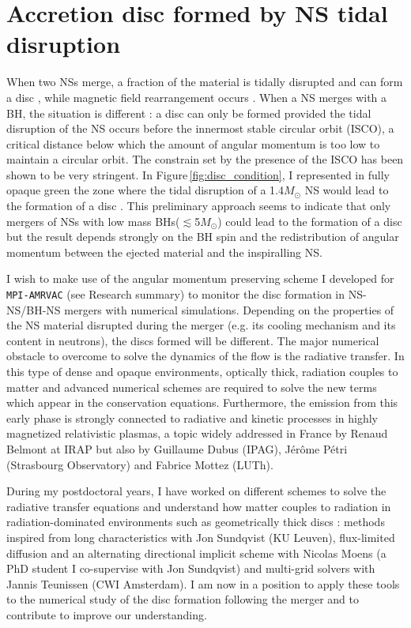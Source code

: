 \documentclass[11pt,onecolumn]{article}
\makeatletter
\newcommand*{\ns}{NS\@\xspace}
\newcommand*{\nss}{NSs\@\xspace}
\newcommand*{\bh}{BH\@\xspace}
\newcommand*{\bhs}{BHs\@\xspace}
\newcommand*{\eg}{e.g.\@\xspace}
\newcommand*{\msun}{$M_{\odot}$\@\xspace}
\makeatother
\begin{document}
\section{Accretion disc formed by \ns tidal disruption}

When two \nss merge, a fraction of the material is tidally disrupted and can form a disc \citep{Baiotti2017}, while magnetic field rearrangement occurs \citep{Crinquand2018}. When a \ns merges with a \bh, the situation is different : a disc can only be formed provided the tidal disruption of the \ns occurs before the innermost stable circular orbit (ISCO), a critical distance below which the amount of angular momentum is too low to maintain a circular orbit. The constrain set by the presence of the ISCO has been shown to be very stringent. In Figure\,\ref{fig:disc_condition}, I represented in fully opaque green the zone where the tidal disruption of a 1.4\msun \ns would lead to the formation of a disc \citep[based on arguments inspired from][]{Foucart2012}. This preliminary approach seems to indicate that only mergers of \nss with low mass \bhs ($\lesssim$5\msun) could lead to the formation of a disc but the result depends strongly on the \bh spin and the redistribution of angular momentum between the ejected material and the inspiralling \ns.

I wish to make use of the angular momentum preserving scheme I developed for \texttt{MPI-AMRVAC} (see Research summary) to monitor the disc formation in \ns-\ns/\bh-\ns mergers with numerical simulations. Depending on the properties of the \ns material disrupted during the merger (\eg its cooling mechanism and its content in neutrons), the discs formed will be different. The major numerical obstacle to overcome to solve the dynamics of the flow is the radiative transfer. In this type of dense and opaque environments, optically thick, radiation couples to matter and advanced numerical schemes are required to solve the new terms which appear in the conservation equations. Furthermore, the emission from this early phase is strongly connected to radiative and kinetic processes in highly magnetized relativistic plasmas, a topic widely addressed in France by Renaud Belmont at IRAP but also by Guillaume Dubus (IPAG), J\'{e}r\^{o}me P\'{e}tri (Strasbourg Observatory) and Fabrice Mottez (LUTh).

During my postdoctoral years, I have worked on different schemes to solve the radiative transfer equations and understand how matter couples to radiation in radiation-dominated environments such as geometrically thick discs : methods inspired from long characteristics with Jon Sundqvist (KU Leuven), flux-limited diffusion and an alternating directional implicit scheme with Nicolas Moens (a PhD student I co-supervise with Jon Sundqvist) and multi-grid solvers with Jannis Teunissen (CWI Amsterdam). I am now in a position to apply these tools to the numerical study of the disc formation following the merger and to contribute to improve our understanding.
\end{document}
